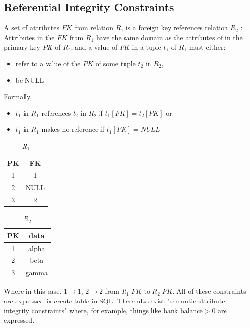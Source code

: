 \documentclass[a4paper]{article}
\theoremstyle{plain}
\theoremstyle{definition}
\theoremstyle{remark}
\begin{document}
	\subsection{Referential Integrity Constraints}
	A set of attributes $FK$ from relation $R_1$ is a foreign key references relation $R_2$ : Attributes in the $FK$ from $R_1$ have the same domain as the attributes of in the primary key $PK$ of $R_2$, and a value of $FK$ in a tuple $t_1$ of $R_1$ must either:
	\begin{itemize}
		\item refer to a value of the $PK$ of some tuple $t_2$ in $R_2$,
		\item be NULL
	\end{itemize}
	Formally,
	\begin{itemize}
		\item $t_1$ in $R_1$ references $t_2$ in $R_2$ if $t_1[FK] = t_2[PK]$ or
		\item $t_1$ in $R_1$ makes no reference if $t_1[FK] = NULL$
	\end{itemize}
	\begin{table}[H]
		\centering
		\caption{$ R_1$}
		\label{tab}
		\begin{tabular}{|c|c|}
			\hline
			PK & FK \\
			\hline 1 & 1 \\
			2 & NULL \\
			3 & 2
			\\ 
			\hline
		
		\end{tabular}
	\end{table}
	\begin{table}[H]
		\centering
		\caption{$R_2$}
		\label{tab:r2}
		\begin{tabular}{|c|c|}
		\hline PK & data \\
		\hline 1 & alpha \\
		2 & beta \\
		3 & gamma \\
		\hline
		\end{tabular}
	\end{table}
	Where in this case. $1 \to 1$, $2 \to  2$ from $R_1 \; FK$ to $R_2 \; PK$. All of these constraints are expressed in create table in SQL. There also exist "semantic attribute integrity constraints" where, for example, things like $\text{bank balance} > 0 $ are expressed.
\end{document}
